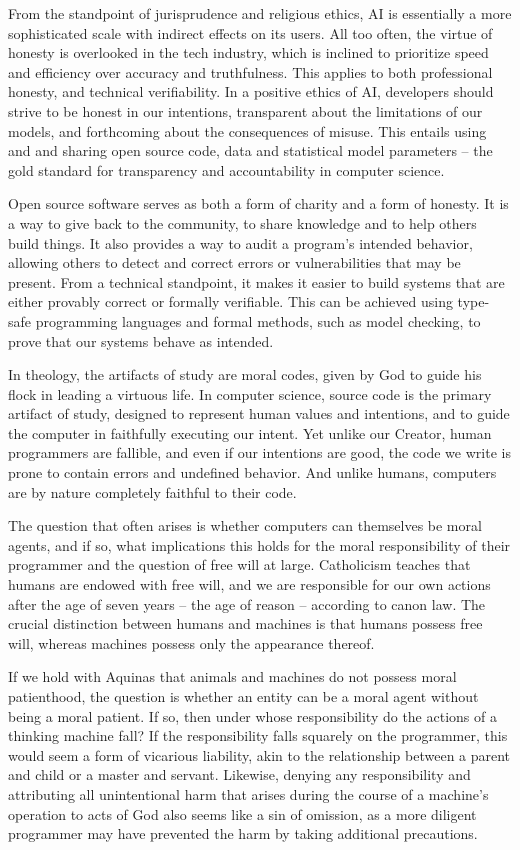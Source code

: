 \documentclass[sigplan,nonacm]{acmart}\settopmatter{printfolios=false,printccs=false,printacmref=false}
\begin{document}
From the standpoint of jurisprudence and religious ethics, AI is essentially a more sophisticated scale with indirect effects on its users. All too often, the virtue of honesty is overlooked in the tech industry, which is inclined to prioritize speed and efficiency over accuracy and truthfulness. This applies to both professional honesty, and technical verifiability. In a positive ethics of AI, developers should strive to be honest in our intentions, transparent about the limitations of our models, and forthcoming about the consequences of misuse. This entails using and and sharing open source code, data and statistical model parameters -- the gold standard for transparency and accountability in computer science.

Open source software serves as both a form of charity and a form of honesty. It is a way to give back to the community, to share knowledge and to help others build things. It also provides a way to audit a program's intended behavior, allowing others to detect and correct errors or vulnerabilities that may be present. From a technical standpoint, it makes it easier to build systems that are either provably correct or formally verifiable. This can be achieved using type-safe programming languages and formal methods, such as model checking, to prove that our systems behave as intended.

In theology, the artifacts of study are moral codes, given by God to guide his flock in leading a virtuous life. In computer science, source code is the primary artifact of study, designed to represent human values and intentions, and to guide the computer in faithfully executing our intent. Yet unlike our Creator, human programmers are fallible, and even if our intentions are good, the code we write is prone to contain errors and undefined behavior. And unlike humans, computers are by nature completely faithful to their code.

The question that often arises is whether computers can themselves be moral agents, and if so, what implications this holds for the moral responsibility of their programmer and the question of free will at large. Catholicism teaches that humans are endowed with free will, and we are responsible for our own actions after the age of seven years -- the age of reason -- according to canon law. The crucial distinction between humans and machines is that humans possess free will, whereas machines possess only the appearance thereof.

If we hold with Aquinas that animals and machines do not possess moral patienthood, the question is whether an entity can be a moral agent without being a moral patient. If so, then under whose responsibility do the actions of a thinking machine fall? If the responsibility falls squarely on the programmer, this would seem a form of vicarious liability, akin to the relationship between a parent and child or a master and servant. Likewise, denying any responsibility and attributing all unintentional harm that arises during the course of a machine's operation to acts of God also seems like a sin of omission, as a more diligent programmer may have prevented the harm by taking additional precautions.
\end{document}
